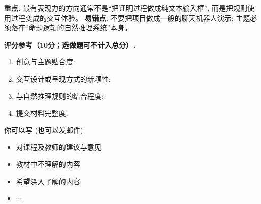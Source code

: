 \documentclass[a4paper, justified]{tufte-handout}
\begin{document}
\begin{solution}
  \begin{remark}
    \textbf{重点.} 最有表现力的方向通常不是“把证明过程做成纯文本输入框”,
    而是把规则使用过程变成的交互体验。
    \textbf{易错点.} 不要把项目做成一般的聊天机器人演示;
    主题必须落在“命题逻辑的自然推理系统”本身。
  \end{remark}

  \textbf{评分参考（10分；选做题可不计入总分）.}
  \begin{enumerate}[(1)]
    \item 创意与主题贴合度: 
    \item 交互设计或呈现方式的新颖性: 
    \item 与自然推理规则的结合程度: 
    \item 提交材料完整度: 
  \end{enumerate}
\end{solution}


\begincorrection

\beginfb

你可以写 (也可以发邮件)
\begin{itemize}
  \item 对课程及教师的建议与意见
  \item 教材中不理解的内容
  \item 希望深入了解的内容
  \item $\cdots$
\end{itemize}
\end{document}
